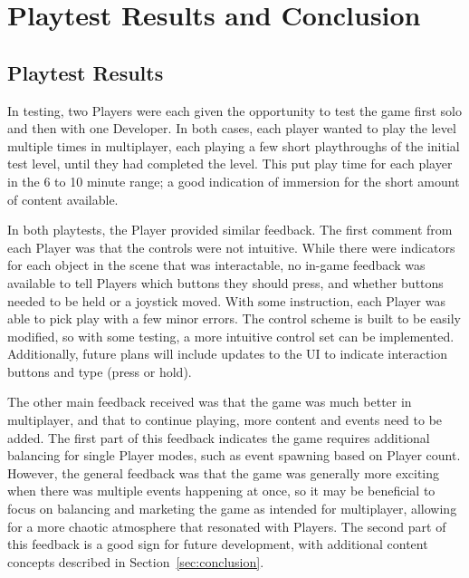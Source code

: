 \section{Playtest Results and Conclusion}

\subsection{Playtest Results}

In testing, two Players were each given the opportunity to test the game first
solo and then with one Developer. In both cases, each player wanted to play
the level multiple times in multiplayer, each playing a few short playthroughs
of the initial test level, until they had completed the level. This put play
time for each player in the 6 to 10 minute range; a good indication of immersion
for the short amount of content available.

In both playtests, the Player provided similar feedback. The first comment from
each Player was that the controls were not intuitive. While there were indicators
for each object in the scene that was interactable, no in-game feedback was
available to tell Players which buttons they should press, and whether buttons
needed to be held or a joystick moved. With some instruction, each Player was
able to pick play with a few minor errors. The control scheme is built to be
easily modified, so with some testing, a more intuitive control set can be
implemented. Additionally, future plans will include updates to the \ac{UI} to
indicate interaction buttons and type (press or hold).

The other main feedback received was that the game was much better in
multiplayer, and that to continue playing, more content and events need to be
added. The first part of this feedback indicates the game requires additional
balancing for single Player modes, such as event spawning based on Player count.
However, the general feedback was that the game was generally more exciting
when there was multiple events happening at once, so it may be beneficial to
focus on balancing and marketing the game as intended for multiplayer, allowing
for a more chaotic atmosphere that resonated with Players. The second part of
this feedback is a good sign for future development, with additional content
concepts described in Section~\ref{sec:conclusion}.

